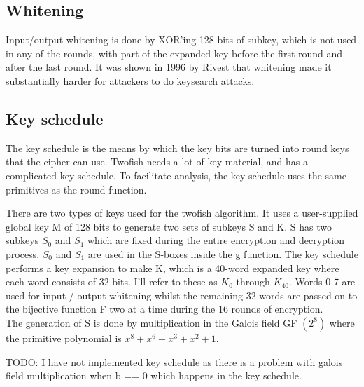 \subsection{Whitening}
Input/output whitening is done by XOR'ing 128 bits of subkey, which is not used in any of the rounds, with part of the expanded key before the first round and after the last round. It was shown in 1996 by Rivest \cite{KR96} that whitening made it substantially harder for attackers to do keysearch attacks.

\subsection{Key schedule}
The key schedule is the means by which the key bits are turned into round keys that the cipher can use.  Twofish needs a lot of key material, and has a complicated key schedule. To facilitate analysis, the key schedule uses the same primitives as the round function.

There are two types of keys used for the twofish algorithm. It uses a user-supplied global key M of 128 bits to generate two sets of subkeys S and K. S has two subkeys $S_0$ and $S_1$ which are fixed during the entire encryption and decryption process. $S_0$ and $S_1$ are used in the S-boxes inside the g function. The key schedule performs a key expansion to make K, which is a 40-word expanded key where each word consists of 32 bits. I'll refer to these as $K_0$ through $K_{40}$. Words 0-7 are used for input / output whitening whilst the remaining 32 words are passed on to the bijective function F two at a time during the 16 rounds of encryption. \\

The generation of S is done by multiplication in the Galois field GF $(2^8)$ where the primitive polynomial is $x^8 + x^6 + x^3 + x^2 + 1$.

TODO: I have not implemented key schedule as there is a problem with galois field multiplication when b == 0 which happens in the key schedule.
